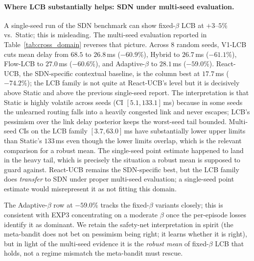 \documentclass[opre,dblanonrev]{informs4}
\begin{document}
\begin{APPENDICES}
\paragraph{Where LCB substantially helps: SDN under multi-seed evaluation.}
A single-seed run of the SDN benchmark can show fixed-$\beta$ LCB
at $+3$--$5\%$ vs.\ Static; this is misleading. The multi-seed
evaluation reported in Table~\ref{tab:cross_domain} reverses
that picture. Across $8$
random seeds, V1-LCB cuts mean delay from $68.5$ to $26.8$\,ms
($-60.9\%$), Hybrid to $26.7$\,ms ($-61.1\%$), Flow-LCB to
$27.0$\,ms ($-60.6\%$), and Adaptive-$\beta$ to $28.1$\,ms
($-59.0\%$). React-UCB, the SDN-specific contextual baseline, is
the column best at $17.7$\,ms ($-74.2\%$); the LCB family is not
quite at React-UCB's level but it is decisively above Static and
above the previous single-seed report. The interpretation is that
Static is highly volatile across seeds (CI $[5.1, 133.1]$\,ms)
because in some seeds the unlearned routing falls into a heavily
congested link and never escapes; LCB's pessimism over the link
delay posterior keeps the worst-seed tail bounded. Multi-seed CIs
on the LCB family $[3.7, 63.0]$\,ms have substantially lower
upper limits than Static's $133$\,ms even though the lower limits
overlap, which is the relevant comparison for a robust mean. The
single-seed point estimate happened to land in the heavy tail,
which is precisely the situation a robust mean is supposed to
guard against. React-UCB remains the SDN-specific best, but the
LCB family does \emph{transfer} to SDN under proper multi-seed
evaluation; a single-seed point estimate would misrepresent it as
not fitting this domain.

The Adaptive-$\beta$ row at $-59.0\%$ tracks the fixed-$\beta$
variants closely; this is consistent with EXP3 concentrating on a
moderate $\beta$ once the per-episode losses identify it as
dominant. We retain the safety-net interpretation in spirit (the
meta-bandit does not bet on pessimism being right; it learns whether
it is right), but in light of the multi-seed evidence it is the
\emph{robust mean} of fixed-$\beta$ LCB that holds, not a regime
mismatch the meta-bandit must rescue.


\end{APPENDICES}
\end{document}
